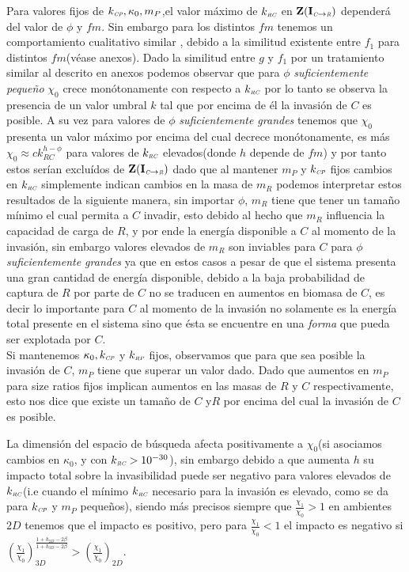 Para valores fijos de $k_{\textit{\tiny CP}}, \kappa_0 ,m_P$,el valor m\'aximo de $k_{\textit{\tiny RC}}$ en $\mathbf{Z(I_{\textit{\tiny C}\to \textit{\tiny R}})}$ depender\'a del valor de $\phi$ y $fm$. Sin embargo para los distintos $fm$ tenemos un comportamiento cualitativo similar , debido a la similitud existente entre $f_1$ para distintos $fm$(v\'ease anexos). Dado la similitud entre $g$ y $f_1$ por un tratamiento similar al descrito en anexos podemos observar que para $\phi$ \emph{suficientemente peque\~no} $\chi_0$ crece mon\'otonamente con respecto a $k_{\textit{\tiny RC}}$ por lo tanto se observa la presencia de un valor umbral $k$ tal que por encima de \'el la invasi\'on de $C$ es posible. A su vez para valores de $\phi$ \emph{suficientemente grandes} tenemos que $\chi_0$ presenta un valor m\'aximo por encima del cual decrece mon\'otonamente, es m\'as $\chi_0 \approx c k_{RC}^{h - \phi}$ para valores de $k_{\textit{\tiny RC}}$ elevados(donde $h$ depende de $fm$) y por tanto estos ser\'ian exclu\'idos de $\mathbf{Z(I_{\textit{\tiny C}\to \textit{\tiny R}})}$ dado que al mantener $m_P$ y $k_{\textit{\tiny CP}}$ fijos cambios en $k_{\textit{\tiny RC}}$ simplemente indican cambios en la masa de $m_R$ podemos interpretar estos resultados de la siguiente manera, sin importar $\phi$, $m_R$ tiene que tener un tama\~no m\'inimo el cual permita a $C$ invadir, esto debido al hecho que $m_R$ influencia la capacidad de carga de $R$, y por ende la energ\'ia disponible a $C$ al momento de la invasi\'on, sin embargo valores elevados de $m_R$ son inviables para $C$ para $\phi$ \emph{suficientemente grandes} ya que en estos casos a pesar de que el sistema presenta una gran cantidad de energ\'ia disponible, debido a la baja probabilidad de captura de $R$ por parte de $C$ no se traducen en aumentos en biomasa de $C$, es decir lo importante para $C$ al momento de la invasi\'on no solamente es la energ\'ia total presente en el sistema sino que \'esta se encuentre en una \emph{forma} que pueda ser explotada por $C$.\\


Si mantenemos $\kappa_0,k_{\textit{\tiny CP}}$ y $k_{\textit{\tiny RP}}$ fijos, observamos que para que sea posible la invasi\'on de $C$, $m_P$ tiene que superar un valor dado. Dado que aumentos en $m_P$ para size ratios fijos implican aumentos en las masas de $R$ y $C$ respectivamente, esto nos dice que existe un tama\~no de $C$ y$R$ por encima del cual la invasi\'on de $C$ es posible.

La dimensi\'on del espacio de b\'usqueda afecta positivamente a $\chi_0$(si asociamos cambios en $\kappa_0$, y con $k_{\textit{\tiny RC}} > 10^{-30}$), sin embargo debido a que aumenta $h$ su impacto total sobre la invasibilidad puede ser negativo para valores elevados de $k_{\textit{\tiny RC}}$(i.e cuando el m\'inimo $k_{\textit{\tiny RC}}$ necesario para la invasi\'on es elevado, como se da para $k_{\textit{\tiny CP}}$ y $m_P$ peque\~nos), siendo m\'as precisos siempre que $\frac{\chi_1}{\chi_0} >1$ en ambientes $2D$ tenemos que el impacto es positivo, pero para $\frac{\chi_1}{\chi_0} < 1$ el impacto es negativo si $ (\frac{\chi_1}{\chi_0})_{3D}^\frac{1 + h_{2D} - 2 \beta}{1 + h_{3D} - 2 \beta} >  (\frac{\chi_1}{\chi_0})_{2D} $.\\


